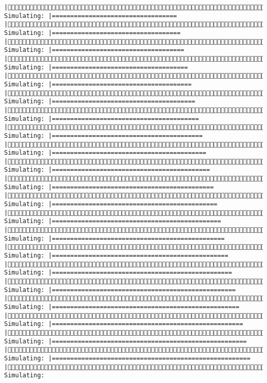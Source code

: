 \documentclass[]{article}
\begin{document}
\begin{verbatim}
|(4/4) Simulating: |==================================                     |(4/4) Simulating: |===================================                    |(4/4) Simulating: |====================================                   |(4/4) Simulating: |=====================================                  |(4/4) Simulating: |======================================                 |(4/4) Simulating: |=======================================                |(4/4) Simulating: |========================================               |(4/4) Simulating: |=========================================              |(4/4) Simulating: |==========================================             |(4/4) Simulating: |===========================================            |(4/4) Simulating: |============================================           |(4/4) Simulating: |=============================================          |(4/4) Simulating: |==============================================         |(4/4) Simulating: |===============================================        |(4/4) Simulating: |================================================       |(4/4) Simulating: |=================================================      |(4/4) Simulating: |==================================================     |(4/4) Simulating: |===================================================    |(4/4) Simulating: |====================================================   |(4/4) Simulating: |=====================================================  |(4/4) Simulating: |====================================================== |(4/4) Simulating: 
\end{verbatim}
\end{document}
